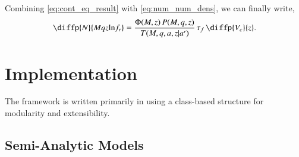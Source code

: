     Combining \eqref{eq:cont_eq_result} with \eqref{eq:num_num_dens}, we can finally write,
    \begin{equation}
        \label{eq:sam_final}
        \diffp{N}{{M}{q}{z}{\ln\!f_r}} = \frac{\Phi(M,z) \, P(M,q,z)}{T(M,q,a,z|a')} \, \thardf \, \diffp{V_c}{z}.
    \end{equation}




\section{Implementation}
    \label{sec:imp}

    The \holodeck{} framework is written primarily in \python{} using a class-based structure for modularity and extensibility.

    \subsection{Semi-Analytic Models}
        \label{sec:imp_sam}





